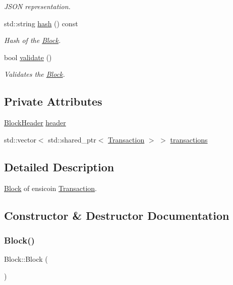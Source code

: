 \begin{DoxyCompactItemize}
\begin{DoxyCompactList}\small\item\em J\+S\+ON representation. \end{DoxyCompactList}\item 
std\+::string \mbox{\hyperlink{classBlock_aee23e922b822767c6e0f1851f8af382f}{hash}} () const
\begin{DoxyCompactList}\small\item\em Hash of the \mbox{\hyperlink{classBlock}{Block}}. \end{DoxyCompactList}\item 
bool \mbox{\hyperlink{classBlock_a95b93fe89c43e5528e26316c6bb0af50}{validate}} ()
\begin{DoxyCompactList}\small\item\em Validates the \mbox{\hyperlink{classBlock}{Block}}. \end{DoxyCompactList}\end{DoxyCompactItemize}
\subsection*{Private Attributes}
\begin{DoxyCompactItemize}
\item 
\mbox{\hyperlink{structBlockHeader}{Block\+Header}} \mbox{\hyperlink{classBlock_ae86925a120ca16a078a4fa44cd3e493a}{header}}
\item 
std\+::vector$<$ std\+::shared\+\_\+ptr$<$ \mbox{\hyperlink{classTransaction}{Transaction}} $>$ $>$ \mbox{\hyperlink{classBlock_a871f51555b26a13d77a437a0255804f5}{transactions}}
\end{DoxyCompactItemize}


\subsection{Detailed Description}
\mbox{\hyperlink{classBlock}{Block}} of ensicoin \mbox{\hyperlink{classTransaction}{Transaction}}. 

\subsection{Constructor \& Destructor Documentation}
\mbox{\label{classBlock_a37658a946bf5067ad01d68d9ff086adc}} 
\subsubsection{\texorpdfstring{Block()}{Block()}\hspace{0.1cm}{\footnotesize\ttfamily [1/3]}}
{\footnotesize\ttfamily Block\+::\+Block (\begin{DoxyParamCaption}{ }\end{DoxyParamCaption})}



